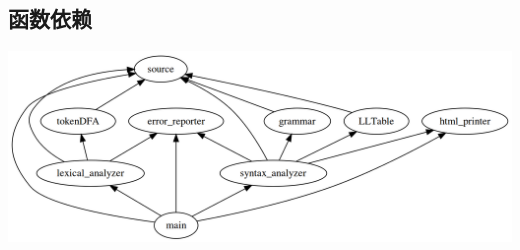 \documentclass[a4paper]{scrartcl}
\begin{document}
\subsection{函数依赖}

\parbox{\linewidth}{
\centering
\includegraphics[width=\textwidth]{image/dependancy.png}
}\\

\section{}
\end{document}

